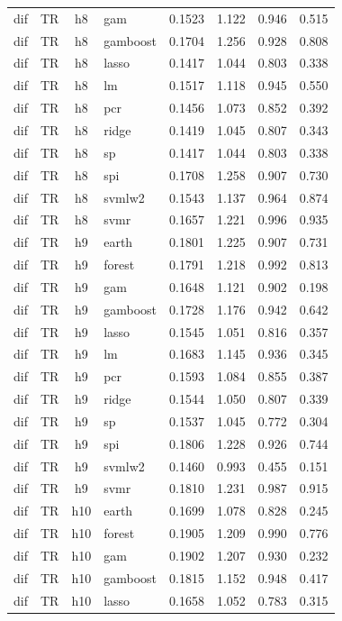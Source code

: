 \begin{ThreePartTable}
\begin{longtable}[t]{llclcccc}
dif & TR & h8 & gam & 0.1523 & 1.122 & 0.946 & 0.515\\
dif & TR & h8 & gamboost & 0.1704 & 1.256 & 0.928 & 0.808\\
dif & TR & h8 & lasso & 0.1417 & 1.044 & 0.803 & 0.338\\
dif & TR & h8 & lm & 0.1517 & 1.118 & 0.945 & 0.550\\
dif & TR & h8 & pcr & 0.1456 & 1.073 & 0.852 & 0.392\\
dif & TR & h8 & ridge & 0.1419 & 1.045 & 0.807 & 0.343\\
dif & TR & h8 & sp & 0.1417 & 1.044 & 0.803 & 0.338\\
dif & TR & h8 & spi & 0.1708 & 1.258 & 0.907 & 0.730\\
dif & TR & h8 & svmlw2 & 0.1543 & 1.137 & 0.964 & 0.874\\
dif & TR & h8 & svmr & 0.1657 & 1.221 & 0.996 & 0.935\\
\addlinespace
dif & TR & h9 & earth & 0.1801 & 1.225 & 0.907 & 0.731\\
dif & TR & h9 & forest & 0.1791 & 1.218 & 0.992 & 0.813\\
dif & TR & h9 & gam & 0.1648 & 1.121 & 0.902 & 0.198\\
dif & TR & h9 & gamboost & 0.1728 & 1.176 & 0.942 & 0.642\\
dif & TR & h9 & lasso & 0.1545 & 1.051 & 0.816 & 0.357\\
dif & TR & h9 & lm & 0.1683 & 1.145 & 0.936 & 0.345\\
dif & TR & h9 & pcr & 0.1593 & 1.084 & 0.855 & 0.387\\
dif & TR & h9 & ridge & 0.1544 & 1.050 & 0.807 & 0.339\\
dif & TR & h9 & sp & 0.1537 & 1.045 & 0.772 & 0.304\\
dif & TR & h9 & spi & 0.1806 & 1.228 & 0.926 & 0.744\\
dif & TR & h9 & svmlw2 & 0.1460 & 0.993 & 0.455 & 0.151\\
dif & TR & h9 & svmr & 0.1810 & 1.231 & 0.987 & 0.915\\
\addlinespace
dif & TR & h10 & earth & 0.1699 & 1.078 & 0.828 & 0.245\\
dif & TR & h10 & forest & 0.1905 & 1.209 & 0.990 & 0.776\\
dif & TR & h10 & gam & 0.1902 & 1.207 & 0.930 & 0.232\\
dif & TR & h10 & gamboost & 0.1815 & 1.152 & 0.948 & 0.417\\
dif & TR & h10 & lasso & 0.1658 & 1.052 & 0.783 & 0.315\\

\end{longtable}
\end{ThreePartTable}
